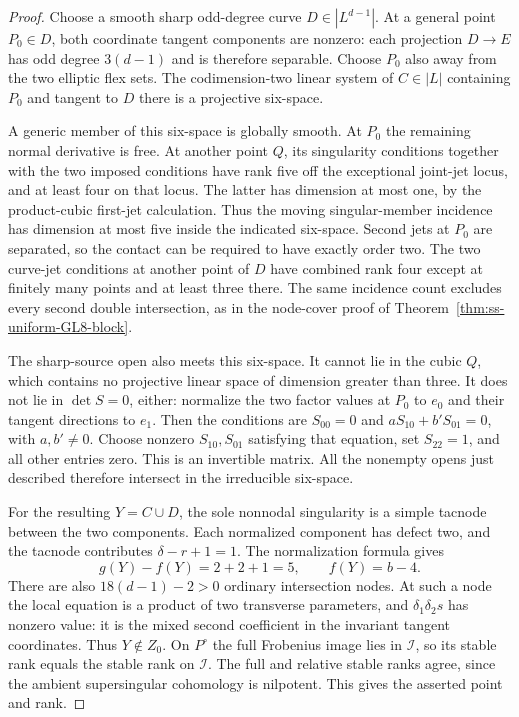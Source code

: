 \begin{proof}
Choose a smooth sharp odd-degree curve $D\in|L^{d-1}|$.
At a general point $P_0\in D$, both coordinate tangent components
are nonzero: each projection $D\to E$ has odd degree $3(d-1)$
and is therefore separable. Choose $P_0$ also away from the two
elliptic flex sets. The codimension-two linear system of
$C\in|L|$ containing $P_0$ and tangent to $D$ there is a
projective six-space.

A generic member of this six-space is globally smooth. At $P_0$
the remaining normal derivative is free. At another point $Q$,
its singularity conditions together with the two imposed
conditions have rank five off the exceptional joint-jet locus,
and at least four on that locus. The latter has dimension at
most one, by the product-cubic first-jet calculation. Thus the
moving singular-member incidence has dimension at most five
inside the indicated six-space. Second jets at $P_0$ are
separated, so the contact can be required to have exactly order
two. The two curve-jet conditions at another point of $D$ have
combined rank four except at finitely many points and at least
three there. The same incidence count excludes every second
double intersection, as in the node-cover proof of
Theorem~\ref{thm:ss-uniform-GL8-block}.

The sharp-source open also meets this six-space. It cannot lie
in the cubic $Q$, which contains no projective linear space of
dimension greater than three. It does not lie in $\det S=0$,
either: normalize the two factor values at $P_0$ to $e_0$ and
their tangent directions to $e_1$. Then the conditions are
$S_{00}=0$ and $aS_{10}+b'S_{01}=0$, with $a,b'\ne0$.
Choose nonzero $S_{10},S_{01}$ satisfying that equation,
set $S_{22}=1$, and all other entries zero. This is an
invertible matrix. All the nonempty opens just described
therefore intersect in the irreducible six-space.

For the resulting $Y=C\cup D$, the sole nonnodal singularity
is a simple tacnode between the two components.
Each normalized component has defect two, and the tacnode
contributes $\delta-r+1=1$. The normalization formula gives
\[
                 g(Y)-f(Y)=2+2+1=5,
 \qquad f(Y)=b-4.
\]
There are also $18(d-1)-2>0$ ordinary intersection nodes.
At such a node the local equation is a product of two transverse
parameters, and $\delta_1\delta_2s$ has nonzero value: it is the
mixed second coefficient in the invariant tangent coordinates.
Thus $Y\notin Z_0$. On $P^\circ$ the full Frobenius image lies
in $\mathcal I$, so its stable rank equals the stable rank on
$\mathcal I$. The full and relative stable ranks agree, since
the ambient supersingular cohomology is nilpotent. This gives
the asserted point and rank.
\end{proof}

